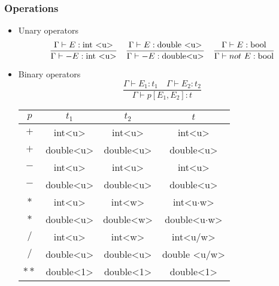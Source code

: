 \documentclass[]{article}
\begin{document}
		\subsubsection{Operations}
		\begin{itemize}
			\item Unary operators
			\[
			\frac{\Gamma \vdash E: \text{int \textless u\textgreater}}{\Gamma \vdash -E: \text{int \textless u\textgreater}} 	\quad
			\frac{\Gamma \vdash E: \text{double \textless u\textgreater}}{\Gamma \vdash -E: 	\text{double\textless u\textgreater}} \quad
			\frac{\Gamma \vdash E: \text{bool}}{\Gamma \vdash not \text{ } E: 	\text{bool}}
			\]
			\item Binary operators
			\[
			\frac{\Gamma \vdash E_1: t_1 \quad \Gamma \vdash E_2: t_2}{\Gamma \vdash 	p[E_1,E_2]: t}
			\]
			\begin{center}
				\begin{tabular}{| c || c | c | c |} 
					\hline
					$p$ & $t_1$ & $t_2$ & $t$ \\ [0.5ex] 
					\hline\hline
					$+$ & int\textless u\textgreater & int\textless u\textgreater & int\textless u\textgreater \\ 
					\hline
					$+$ & double\textless u\textgreater & double\textless u\textgreater & double\textless u\textgreater \\ 
					\hline
					$-$ & int\textless u\textgreater & int\textless u\textgreater & int\textless u\textgreater \\ 
					\hline
					$-$ & double\textless u\textgreater & double\textless u\textgreater & double\textless u\textgreater \\ 
					\hline
					$*$ & int\textless u\textgreater & int\textless w\textgreater & int\textless u$\cdot$w\textgreater \\ 
					\hline
					$*$ & double\textless u\textgreater & double\textless w\textgreater & double\textless u$\cdot$w\textgreater \\ 
					\hline
					$/$ & int\textless u\textgreater & int\textless w\textgreater & int\textless u$/$w\textgreater \\ 
					\hline
					$/$ & double\textless u\textgreater & double\textless u\textgreater & double \textless u$/$w\textgreater \\ 
					\hline
					$**$ & double\textless 1\textgreater & double\textless 1\textgreater & double\textless 1\textgreater \\ 
					\hline
				\end{tabular}
			\end{center}

\end{itemize}
\end{document}
